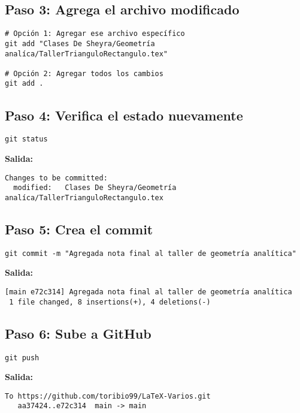\documentclass[12pt,a4paper]{article}
\begin{document}
\subsection{Paso 3: Agrega el archivo modificado}

\begin{lstlisting}[style=bashstyle]
# Opción 1: Agregar ese archivo específico
git add "Clases De Sheyra/Geometría analíca/TallerTrianguloRectangulo.tex"

# Opción 2: Agregar todos los cambios
git add .
\end{lstlisting}

\subsection{Paso 4: Verifica el estado nuevamente}

\begin{lstlisting}[style=bashstyle]
git status
\end{lstlisting}

\textbf{Salida:}
\begin{lstlisting}[style=bashstyle]
Changes to be committed:
  modified:   Clases De Sheyra/Geometría analíca/TallerTrianguloRectangulo.tex
\end{lstlisting}

\subsection{Paso 5: Crea el commit}

\begin{lstlisting}[style=bashstyle]
git commit -m "Agregada nota final al taller de geometría analítica"
\end{lstlisting}

\textbf{Salida:}
\begin{lstlisting}[style=bashstyle]
[main e72c314] Agregada nota final al taller de geometría analítica
 1 file changed, 8 insertions(+), 4 deletions(-)
\end{lstlisting}

\subsection{Paso 6: Sube a GitHub}

\begin{lstlisting}[style=bashstyle]
git push
\end{lstlisting}

\textbf{Salida:}
\begin{lstlisting}[style=bashstyle]
To https://github.com/toribio99/LaTeX-Varios.git
   aa37424..e72c314  main -> main
\end{lstlisting}
\end{document}
